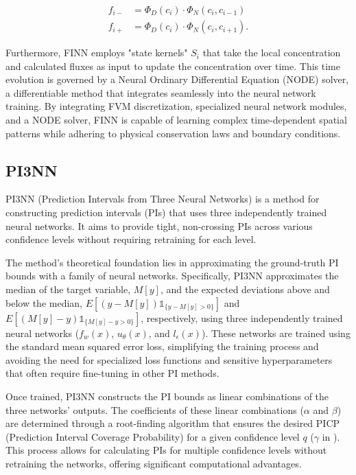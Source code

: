 \documentclass{article}
\newcommand{\ind}[1]{\mathbb{1}_{\{#1\}}}
\begin{document}
\begin{align*}
    f_{i-} &= \Phi_D(c_i) \cdot \Phi_N(c_i, c_{i-1}) \\
    f_{i+} &= \Phi_D(c_i) \cdot \Phi_N(c_i, c_{i+1}).
\end{align*}

Furthermore, FINN employs "state kernels" $S_i$ that take the local concentration and calculated fluxes as input to update the concentration over time. This time evolution is governed by a Neural Ordinary Differential Equation (NODE) solver, a differentiable method that integrates seamlessly into the neural network training. By integrating FVM discretization, specialized neural network modules, and a NODE solver, FINN is capable of learning complex time-dependent spatial patterns while adhering to physical conservation laws and boundary conditions.



\subsection{PI3NN}
PI3NN (Prediction Intervals from Three Neural Networks) \cite{pi3nn} is a method for constructing prediction intervals (PIs) that uses three independently trained neural networks. It aims to provide tight, non-crossing PIs across various confidence levels without requiring retraining for each level.

The method's theoretical foundation lies in approximating the ground-truth PI bounds with a family of neural networks. Specifically, PI3NN approximates the median of the target variable, $M[y]$, and the expected deviations above and below the median, $E[(y - M[y])\ind{y-M[y]>0}]$ and $E[(M[y] - y)\ind{M[y]-y>0}]$, respectively, using three independently trained neural networks ($f_w(x)$, $u_\theta(x)$, and $l_\epsilon(x)$). These networks are trained using the standard mean squared error loss, simplifying the training process and avoiding the need for specialized loss functions and sensitive hyperparameters that often require fine-tuning in other PI methods.

Once trained, PI3NN constructs the PI bounds as linear combinations of the three networks' outputs. The coefficients of these linear combinations ($\alpha$ and $\beta$) are determined through a root-finding algorithm that ensures the desired PICP (Prediction Interval Coverage Probability) for a given confidence level $q$ ($\gamma$ in \cite{pi3nn}). This process allows for calculating PIs for multiple confidence levels without retraining the networks, offering significant computational advantages.
\end{document}
